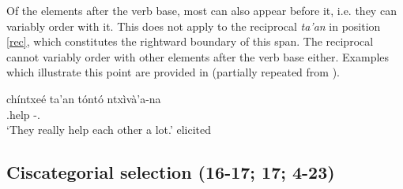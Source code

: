 \documentclass[output=paper]{langscibook}
\begin{document}
Of the elements after the verb base, most can also appear before it, i.e. they can variably order with it. This does not apply to the reciprocal \textit{ta'an} in position \ref{rec}, which constitutes the rightward boundary of this span. 
The reciprocal cannot variably order with other elements after the verb base either. Examples which illustrate this point are provided in  (partially repeated from ).

\ea \label{ex:permutright}
 \ea 
    \gll chíntxeé ta’an tóntó ntxìvà’a-na	\\
		\Incmpl.help \Recp{} \Intens{} \Intens-\Tpl.\Hum{}		\\
	\glt `They really help each other a lot.' \hfill elicited
 \z
\z



\subsection{Ciscategorial selection (16-17; 17; 4-23)} %
\label{sub:ciscategorialselection}
\end{document}
